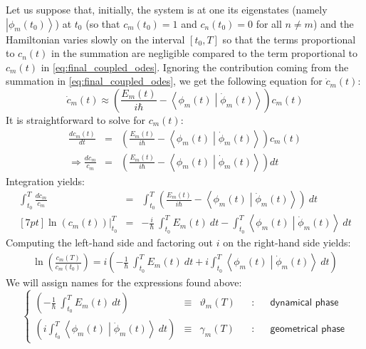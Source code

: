 \documentclass[12pt,a4paper]{article}
\begin{document}
	Let us suppose that, initially, the system is at one its eigenstates (namely $\left| \phi_{m}(t_{0}) \right\rangle$) at $t_{0}$ (so that $c_{m}(t_{0}) = 1$ and $c_{n}(t_{0}) = 0$ for all $n \neq m$) and the Hamiltonian varies slowly on the interval $\left[ t_{0}, T \right]$ so that the terms proportional to $c_{n}(t)$ in the summation are negligible compared to the term proportional to $c_{m}(t)$ in \eqref{eq:final_coupled_odes}. Ignoring the contribution coming from the summation in \eqref{eq:final_coupled_odes}, we get the following equation for $\dot{c}_{m}(t)$:
	\begin{equation}
		\dot{c}_{m}(t) \approx \left( \frac{E_{m}(t)}{i \hbar} - \left\langle \phi_{m}(t) \middle| \dot{\phi}_{m}(t) \right\rangle \right)c_{m}(t) 
		\label{eq:adiabatic_ode}
	\end{equation}
	It is straightforward to solve for $c_{m}(t)$:
	\begin{eqnarray}
		\frac{dc_{m}(t)}{dt} &=& \left( \frac{E_{m}(t)}{i \hbar} - \left\langle \phi_{m}(t) \middle| \dot{\phi}_{m}(t) \right\rangle \right)c_{m}(t) \\
		\Rightarrow \frac{dc_{m}}{c_{m}} &=& \left( \frac{E_{m}(t)}{i \hbar} - \left\langle \phi_{m}(t) \middle| \dot{\phi}_{m}(t) \right\rangle \right) dt
	\end{eqnarray}
	Integration yields:
	\begin{eqnarray}
		\int_{t_{0}}^{T} \frac{dc_{m}}{c_{m}} &=& \int_{t_{0}}^{T} \left( \frac{E_{m}(t)}{i \hbar} - \left\langle \phi_{m}(t) \middle| \dot{\phi}_{m}(t) \right\rangle \right)\ dt \\ [7pt]
		\left. \ln (c_{m}(t))\right|_{t_{0}}^{T} &=& -\frac{i}{\hbar}\ \int_{t_{0}}^{T} E_{m}(t)\ dt - \int_{t_{0}}^{T} \left\langle \phi_{m}(t) \middle| \dot{\phi}_{m}(t) \right\rangle\ dt
		\label{eq:integrated_adiabatic}
	\end{eqnarray}
	Computing the left-hand side and factoring out $i$ on the right-hand side yields:
	\begin{eqnarray}
		\ln\left(\frac{c_{m}(T)}{c_{m}(t_{0})}\right) = i \left( -\frac{1}{\hbar}\ \int_{t_{0}}^{T} E_{m}(t)\ dt + i \int_{t_{0}}^{T} \left\langle \phi_{m}(t) \middle| \dot{\phi}_{m}(t) \right\rangle\ dt \right)
		\label{eq:log_phases}
	\end{eqnarray}
	We will assign names for the expressions found above:
	\[
	\boxed{
		\left\{
		\begin{aligned}
			\left(-\frac{1}{\hbar}\ \int_{t_{0}}^{T} E_{m}(t)\ dt \right) &\equiv& \vartheta_{m}(T) &&:&& \textsf{dynamical phase} \\
			\left( i \int_{t_{0}}^{T} \left\langle \phi_{m}(t) \middle| \dot{\phi}_{m}(t) \right\rangle\ dt \right) &\equiv& \gamma_{m}(T) &&:&& \textsf{geometrical phase}
		\end{aligned}
		\right.}
	\]
\end{document}
